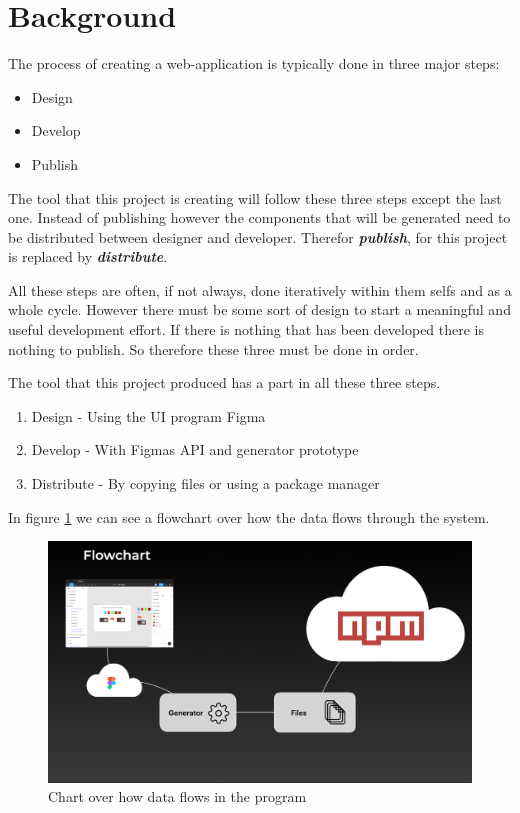 \section{Background}

The process of creating a web-application is typically done in three major steps: 
\begin{itemize}
  \item Design
  \item Develop
  \item Publish
\end{itemize}

The tool that this project is creating will follow these three steps except the last one. Instead of publishing however the components that will be generated need to be distributed between designer and developer. Therefor \textbf{\textit{publish}}, for this project is replaced by \textbf{\textit{distribute}}.

All these steps are often, if not always, done iteratively within them selfs and as a whole cycle. However there must be some sort of design to start a meaningful and useful development effort. If there is nothing that has been developed there is nothing to publish. So therefore these three must be done in order. 

The tool that this project produced has a part in all these three steps.
\begin{enumerate}
  \item Design - Using the UI program Figma
  \item Develop - With Figmas API and generator prototype 
  \item Distribute - By copying files or using a package manager
\end{enumerate}

In figure \ref{fig:flow} we can see a flowchart over how the data flows through the system.

\begin{figure}[H]
  \centering
  \includegraphics[width=0.8\linewidth]{images/flow.png}
  \caption{Chart over how data flows in the program}%
  \label{fig:flow}
\end{figure}



